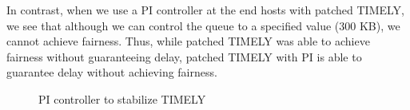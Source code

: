 In contrast, when we use a PI controller at the end hosts with patched
TIMELY, we see that although we can control the queue
to a specified value (300 KB), we cannot achieve fairness. Thus, while
patched TIMELY was able to achieve fairness without guaranteeing
delay, patched TIMELY with PI is able to guarantee delay without
achieving fairness.
\begin{figure}
\center
{}
\caption{PI controller to stabilize TIMELY}
\label{fig:timely_pi}
\end{figure}

